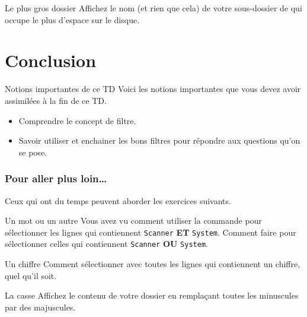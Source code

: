 \documentclass[a4paper,11pt]{style-esi/td}
\begin{document}
		\begin{Exemple}{Le plus gros dossier}
			Affichez le nom (et rien que cela)
			de votre sous-dossier de 
			qui occupe le plus d'espace sur le disque.
		\end{Exemple}

\section{Conclusion}

	\begin{theorie}{Notions importantes de ce TD}
		Voici les notions importantes que vous devez avoir assimilées à la fin de ce TD.
		\begin{itemize}
		\item Comprendre le concept de filtre.
		\item Savoir utiliser et enchainer les bons filtres pour répondre
			aux questions qu'on se pose.
		\end{itemize}
	\end{theorie}

	\subsubsection*{Pour aller plus loin\dots}
	Ceux qui ont du temps peuvent aborder les exercices suivants.
	
	\begin{Exercice}{Un mot ou un autre}
		Vous avez vu comment utiliser la commande 
		pour sélectionner les lignes qui contiennent \verb_Scanner_
		\textbf{ET} \verb_System_.
		Comment faire pour sélectionner celles qui contiennent
		\verb_Scanner_ \textbf{OU} \verb_System_.
	\end{Exercice}
	
	\begin{Exercice}{Un chiffre}
		Comment sélectionner avec 
		toutes les lignes qui contiennent un chiffre, quel qu'il soit.
	\end{Exercice}

	\begin{Exercice}{La casse}
		Affichez le contenu de votre dossier en remplaçant
		toutes les minuscules par des majuscules. 
	\end{Exercice}
\end{document}
